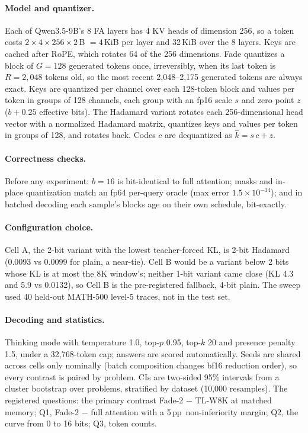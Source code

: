 \documentclass{article}
\newcommand{\pp}{\,pp}
\begin{document}
\paragraph{Model and quantizer.} Each of Qwen3.5-9B's 8 FA layers has 4 KV heads of dimension 256, so a token costs $2\times4\times256\times2$\,B $= 4$\,KiB per layer and 32\,KiB over the 8 layers. Keys are cached after RoPE, which rotates 64 of the 256 dimensions. Fade quantizes a block of $G{=}128$ generated tokens once, irreversibly, when its last token is $R{=}2{,}048$ tokens old, so the most recent 2,048--2,175 generated tokens are always exact. Keys are quantized per channel over each 128-token block and values per token in groups of 128 channels, each group with an fp16 scale $s$ and zero point $z$ ($b{+}0.25$ effective bits). The Hadamard variant rotates each 256-dimensional head vector with a normalized Hadamard matrix, quantizes keys and values per token in groups of 128, and rotates back. Codes $c$ are dequantized as $\hat{k} = s\,c + z$.

\paragraph{Correctness checks.} Before any experiment: $b{=}16$ is bit-identical to full attention; masks and in-place quantization match an fp64 per-query oracle (max error $1.5{\times}10^{-14}$); and in batched decoding each sample's blocks age on their own schedule, bit-exactly.

\paragraph{Configuration choice.} Cell A, the 2-bit variant with the lowest teacher-forced KL, is 2-bit Hadamard (0.0093 vs 0.0099 for plain, a near-tie). Cell B would be a variant below 2 bits whose KL is at most the 8K window's; neither 1-bit variant came close (KL 4.3 and 5.9 vs 0.0132), so Cell B is the pre-registered fallback, 4-bit plain. The sweep used 40 held-out MATH-500 level-5 traces, not in the test set.

\paragraph{Decoding and statistics.} Thinking mode with temperature 1.0, top-$p$ 0.95, top-$k$ 20 and presence penalty 1.5, under a 32,768-token cap; answers are scored automatically. Seeds are shared across cells only nominally (batch composition changes bf16 reduction order), so every contrast is paired by problem. CIs are two-sided 95\% intervals from a cluster bootstrap over problems, stratified by dataset (10,000 resamples). The registered questions: the primary contrast Fade-2 $-$ TL-W8K at matched memory; Q1, Fade-2 $-$ full attention with a 5\pp\ non-inferiority margin; Q2, the curve from 0 to 16 bits; Q3, token counts.
\end{document}
